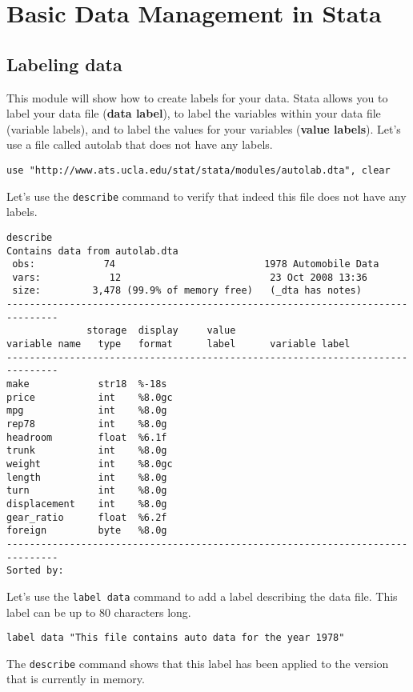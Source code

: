\section{Basic Data Management in Stata}
\subsection{Labeling data}
This module will show how to create labels for your data.  Stata allows you to label your data file (\textbf{data label}), to label the variables within your data file (variable labels), and to label the values for your variables (\textbf{value labels}).  Let's use a file called autolab that does not have any labels.

\begin{lstlisting}
use "http://www.ats.ucla.edu/stat/stata/modules/autolab.dta", clear
\end{lstlisting}

Let's use the \lstinline{describe} command to verify that indeed this file does not have any labels.

\begin{lstlisting}
describe
Contains data from autolab.dta
 obs:            74                          1978 Automobile Data
 vars:            12                          23 Oct 2008 13:36
 size:         3,478 (99.9% of memory free)   (_dta has notes)
-------------------------------------------------------------------------------
              storage  display     value
variable name   type   format      label      variable label
-------------------------------------------------------------------------------
make            str18  %-18s
price           int    %8.0gc
mpg             int    %8.0g
rep78           int    %8.0g
headroom        float  %6.1f
trunk           int    %8.0g
weight          int    %8.0gc
length          int    %8.0g
turn            int    %8.0g
displacement    int    %8.0g
gear_ratio      float  %6.2f
foreign         byte   %8.0g
-------------------------------------------------------------------------------
Sorted by:
\end{lstlisting}

Let's use the \lstinline{label data} command to add a label describing the data file.  This label can be up to 80 characters long.

\begin{lstlisting}
label data "This file contains auto data for the year 1978"
\end{lstlisting}

The \lstinline{describe} command shows that this label has been applied to the version that is currently in memory.

